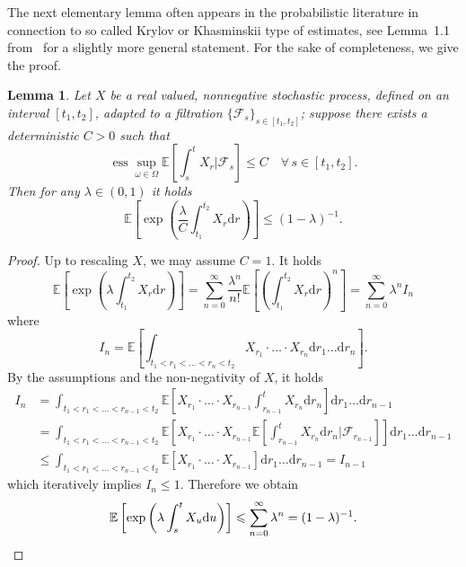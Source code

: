 \documentclass[11pt,oneside,reqno]{amsart}
\newcommand{\mathd}{\mathrm{d}}
\newcommand{\tmop}[1]{\ensuremath{\operatorname{#1}}}
\newtheorem{lemma}[theorem]{Lemma}
\numberwithin{equation}{section}
\begin{document}
The next elementary lemma often appears in the probabilistic literature in
connection to so called Krylov or Khasminskii type of estimates, see Lemma~1.1
from~{\cite{portenko1990}} for a slightly more general statement. For the sake
of completeness, we give the proof.

\begin{lemma}
  \label{lem:gauss-lemma1}Let $X$ be a real valued, nonnegative stochastic
  process, defined on an interval $[t_1, t_2]$, adapted to a filtration $\{
  \mathcal{F}_s \}_{s \in [t_1, t_2]}$; suppose there exists a deterministic
  $C > 0$ such that
  \[ \tmop{ess} \sup_{\omega \in \Omega} \mathbb{E} \left[ \int_s^t X_r |
     \mathcal{F}_s \right] \leqslant C \quad \forall \, s \in [t_1, t_2] . \]
  Then for any $\lambda \in (0, 1)$ it holds
  \[ \mathbb{E} \left[ \exp \left( \frac{\lambda}{C} \int_{t_1}^{t_2} X_r
     \mathd r \right) \right] \leqslant (1 - \lambda)^{- 1} . \]
\end{lemma}

\begin{proof}
  Up to rescaling $X$, we may assume $C = 1$. It holds
  \[ \mathbb{E} \left[ \exp \left( \lambda \int_{t_1}^{t_2} X_r \mathd r
     \right) \right] = \sum_{n = 0}^{\infty} \frac{\lambda^n}{n!} \mathbb{E}
     \left[ \left( \int_{t_1}^{t_2} X_r \mathd r \right)^n \right] = \sum_{n =
     0}^{\infty} \lambda^n I_n \]
  where
  \[ I_n =\mathbb{E} \left[ \int_{t_1 < r_1 < \ldots < r_n < t_2} X_{r_1}
     \cdot \ldots \cdot X_{r_n} \mathd r_1 \ldots \mathd r_n \right] . \]
  By the assumptions and the non-negativity of $X$, it holds
%  
  \begin{align*}
    I_n & = \int_{t_1 < r_1 < \ldots < r_{n - 1} < t_2} \mathbb{E} \left[
    X_{r_1} \cdot \ldots \cdot X_{r_{n - 1}} \int_{r_{n - 1}}^t X_{r_n} \mathd
    r_n \right] \mathd r_1 \ldots \mathd r_{n - 1}\\
    & = \int_{t_1 < r_1 < \ldots < r_{n - 1} < t_2} \mathbb{E} \left[ X_{r_1}
    \cdot \ldots \cdot X_{r_{n - 1}} \mathbb{E} \left[ \int_{r_{n - 1}}^t
    X_{r_n} \mathd r_n | \mathcal{F}_{r_{n - 1}} \right] \right] \mathd r_1
    \ldots \mathd r_{n - 1}\\
    & \leqslant \int_{t_1 < r_1 < \ldots < r_{n - 1} < t_2} \mathbb{E}
    [X_{r_1} \cdot \ldots \cdot X_{r_{n - 1}}] \mathd r_1 \ldots \mathd r_{n -
    1} = I_{n - 1}
  \end{align*}
%  
  which iteratively implies $I_n \leqslant 1$. Therefore we obtain
  \[ \mathbb{E} \left[ \exp \left( \lambda \int_s^t X_u \mathd u \right)
     \right] \leqslant \sum_{n = 0}^{\infty} \lambda^n = (1 - \lambda)^{- 1} . \qedhere
  \]
\end{proof}
\end{document}

